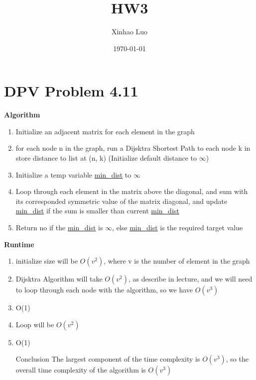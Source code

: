 \documentclass{article}
\title{HW3}
\author{Xinhao Luo}
\date{\today}
\begin{document}
\maketitle

\section{DPV Problem 4.11}

\textbf{Algorithm}

\begin{enumerate}[Step 1]
    \item Initialize an adjacent matrix for each element in the graph
    \item for each node n in the graph, run a Dijsktra Shortest Path to each node k in store distance to list at (n, k) (Initialize default distance to $\infty$)
    \item Initialize a temp variable \underline{min\_dist} to $\infty$
    \item Loop through each element in the matrix above the diagonal, and sum with its corresponded symmetric value of the matrix diagonal, and update \underline{min\_dist} if the sum is smaller than current \underline{min\_dist}
    \item Return no if the \underline{min\_dist} is $\infty$, else \underline{min\_dist} is the required target value
\end{enumerate}

\textbf{Runtime}

\begin{enumerate}[Step 1]
    \item initialize size will be $O(v^2)$, where v is the number of element in the graph
    \item Dijsktra Algorithm will take $O(v^2)$, as describe in lecture, and we will need to loop through each node with the algorithm, so we have $O(v^3)$
    \item O(1)
    \item Loop will be $O(v^2)$
    \item O(1)
    \item [Conclusion] The largest component of the time complexity is $O(v^3)$, so the overall time complexity of the algorithm is $O(v^3)$
\end{enumerate}
\end{document}
